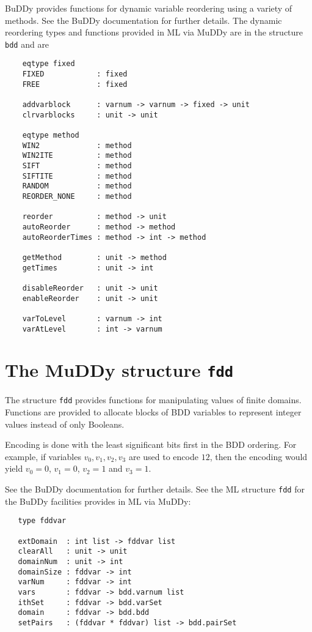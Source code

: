 \documentclass[12pt]{article}
\renewcommand{\t}[1]{\mbox{\tt #1}}
\newcommand{\Buddy}{BuDDy\xspace}
\newcommand{\Muddy}{MuDDy\xspace}
\begin{document}
\Buddy{} provides functions for dynamic variable reordering using a variety of methods.
See the \Buddy{} documentation \cite{BuDDy} for further details. The dynamic reordering
types and functions provided in ML via \Muddy{} are in the structure \t{bdd} and are

{\tiny\begin{verbatim}
    eqtype fixed
    FIXED            : fixed
    FREE             : fixed

    addvarblock      : varnum -> varnum -> fixed -> unit
    clrvarblocks     : unit -> unit

    eqtype method
    WIN2             : method
    WIN2ITE          : method
    SIFT             : method
    SIFTITE          : method
    RANDOM           : method
    REORDER_NONE     : method

    reorder          : method -> unit
    autoReorder      : method -> method
    autoReorderTimes : method -> int -> method

    getMethod        : unit -> method
    getTimes         : unit -> int

    disableReorder   : unit -> unit
    enableReorder    : unit -> unit

    varToLevel       : varnum -> int
    varAtLevel       : int -> varnum
\end{verbatim}}

\section{The \Muddy{} structure \t{fdd}}\label{fdd}

The structure \t{fdd} provides functions for manipulating values of finite domains.
Functions are provided to allocate blocks of BDD variables to represent integer values instead
of only Booleans.

Encoding is done with the least significant bits first in the BDD ordering. For example, if variables
$v_0, v_1, v_2, v_3$ are used to encode $12$, then the encoding would yield
$v_0=0$, $v_1=0$, $v_2=1$ and $v_3=1$.

See the \Buddy{} documentation \cite{BuDDy} for further details. See the ML structure \t{fdd}
for the \Buddy{} facilities provides in ML via \Muddy:

{\tiny\begin{verbatim}
   type fddvar

   extDomain  : int list -> fddvar list
   clearAll   : unit -> unit
   domainNum  : unit -> int
   domainSize : fddvar -> int
   varNum     : fddvar -> int
   vars       : fddvar -> bdd.varnum list
   ithSet     : fddvar -> bdd.varSet
   domain     : fddvar -> bdd.bdd
   setPairs   : (fddvar * fddvar) list -> bdd.pairSet
\end{verbatim}}
\end{document}
